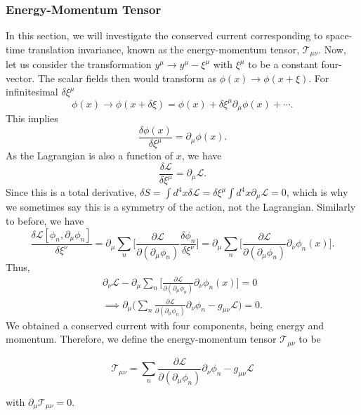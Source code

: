 \documentclass[11pt]{article}
\theoremstyle{definition}
\begin{document}
\subsubsection{Energy-Momentum Tensor}
In this section, we will investigate the conserved current corresponding to space-time translation invariance, known as the energy-momentum tensor, $\mathcal{T}_{\mu\nu}$. Now, let us consider the transformation $y^\mu \rightarrow y^\mu - \xi^\mu$ with $\xi^\mu$ to be a constant four-vector. The scalar fields then would transform as $\phi(x) \rightarrow \phi(x+\xi)$. For infinitesimal $\delta\xi^\mu$
\begin{equation}
    \phi(x) \rightarrow \phi(x+\delta\xi)= \phi(x) + \delta\xi^\mu\partial_\mu\phi(x)+\cdots.
    \end{equation}
This implies
\begin{equation}
    \frac{\delta\phi(x)}{\delta\xi^\mu} = \partial_\mu\phi(x).
\end{equation}
As the Lagrangian is also a function of $x$, we have
\begin{equation}
    \frac{\delta\mathcal{L}}{\delta\xi^\mu} = \partial_\mu\mathcal{L}.
\end{equation}
Since this is a total derivative, $\delta S = \int d^4x \delta\mathcal{L}=\delta\xi^\mu\int d^4x \partial_\mu\mathcal{L}=0$, which is why we sometimes say this is a symmetry of the action, not the Lagrangian.
Similarly to before, we have
\begin{equation}
    \frac{\delta\mathcal{L}[\phi_n,\partial_\mu\phi_n]}{\delta\xi^\nu} = \partial_\mu\sum _n\biggr [\frac{\partial\mathcal{L}}{\partial(\partial_\mu\phi_n)}\frac{\delta\phi_n}{\delta\xi^\nu} \biggr] = \partial_\mu\sum _n\biggr[\frac{\partial\mathcal{L}}{\partial(\partial_\mu\phi_n)}\partial_\nu\phi_n(x)\biggr].
\end{equation}
Thus, 
\begin{equation}
\begin{aligned}
        \partial_\nu\mathcal{L}-\partial_\mu\sum _n\biggr[\frac{\partial\mathcal{L}}{\partial(\partial_\mu\phi_n)}\partial_\nu\phi_n(x)\biggr] = 0 \\
        \implies \partial_\mu \biggr(\sum _n\frac{\partial\mathcal{L}}{\partial(\partial_\mu\phi_n)}\partial_\nu\phi_n - g_{\mu\nu}\mathcal{L}\bigg)=0.
\end{aligned}
\end{equation}
We obtained a conserved current with four components, being energy and momentum. Therefore, we define the energy-momentum tensor $\mathcal{T}_{\mu\nu}$ to be
\begin{shaded}
    \begin{equation}
        \mathcal{T}_{\mu\nu} = \sum _n\frac{\partial\mathcal{L}}{\partial(\partial_\mu\phi_n)}\partial_\nu\phi_n - g_{\mu\nu}\mathcal{L}
    \end{equation}
\end{shaded}
with $\partial_\mu\mathcal{T}_{\mu\nu} = 0$.
\end{document}
